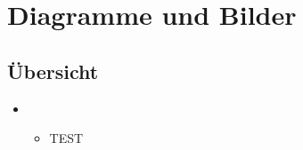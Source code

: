 \documentclass[Bachelorarbeit.tex]{subfiles}
\begin{document}
\chapter{Diagramme und Bilder}
\label{chap:diagramme_und_bilder}

\section{Übersicht}
\begin{itemize} 
\item
	\begin{itemize}
		\item TEST
	\end{itemize}
\end{itemize}
\end{document}
